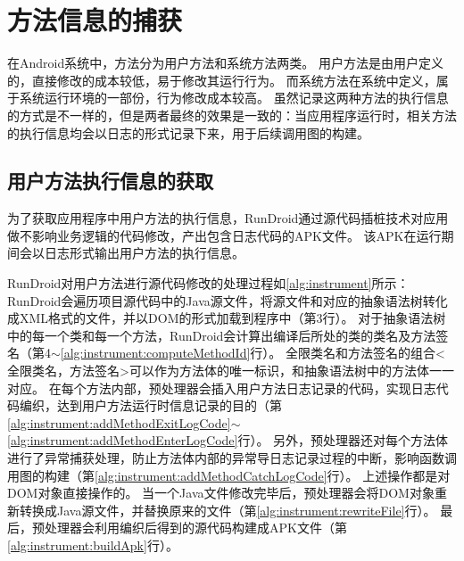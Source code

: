



\section{方法信息的捕获}

在Android系统中，方法分为用户方法和系统方法两类。
用户方法是由用户定义的，直接修改的成本较低，易于修改其运行行为。
而系统方法在系统中定义，属于系统运行环境的一部份，行为修改成本较高。
虽然记录这两种方法的执行信息的方式是不一样的，但是两者最终的效果是一致的：当应用程序运行时，相关方法的执行信息均会以日志的形式记录下来，用于后续调用图的构建。


\subsection{用户方法执行信息的获取}%

为了获取应用程序中用户方法的执行信息，RunDroid通过源代码插桩技术对应用做不影响业务逻辑的代码修改，产出包含日志代码的APK文件。
该APK在运行期间会以日志形式输出用户方法的执行信息。

RunDroid对用户方法进行源代码修改的处理过程如\autoref{alg:instrument}所示：
RunDroid会遍历项目源代码中的Java源文件，将源文件和对应的抽象语法树转化成XML格式的文件，并以DOM的形式加载到程序中（第3行）。
对于抽象语法树中的每一个类和每一个方法，RunDroid会计算出编译后所处的类的类名及方法签名（第4$\sim$\ref{alg:instrument:computeMethodId}行）。
全限类名和方法签名的组合<全限类名，方法签名>可以作为方法体的唯一标识，和抽象语法树中的方法体一一对应。
在每个方法内部，预处理器会插入用户方法日志记录的代码，实现日志代码编织，达到用户方法运行时信息记录的目的（第\ref{alg:instrument:addMethodExitLogCode}$\sim$\ref{alg:instrument:addMethodEnterLogCode}行）。
另外，预处理器还对每个方法体进行了异常捕获处理，防止方法体内部的异常导日志记录过程的中断，影响函数调用图的构建（第\ref{alg:instrument:addMethodCatchLogCode}行）。
上述操作都是对DOM对象直接操作的。
当一个Java文件修改完毕后，预处理器会将DOM对象重新转换成Java源文件，并替换原来的文件（第\ref{alg:instrument:rewriteFile}行）。
最后，预处理器会利用编织后得到的源代码构建成APK文件（第\ref{alg:instrument:buildApk}行）。




